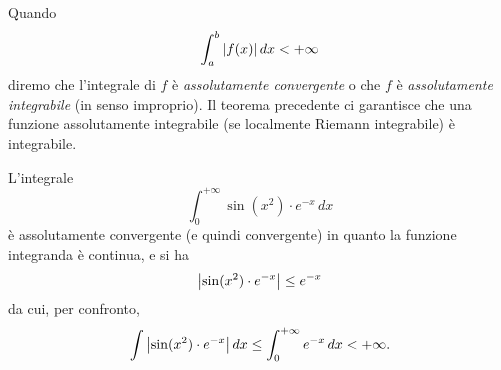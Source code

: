 \begin{definition}
%
%
%
%
%
Quando
\[
  \int_a^b {\left|f(x)\right|}\, dx <+\infty
\]
diremo che l'integrale di $f$ è \emph{assolutamente convergente}
o che $f$ è \emph{assolutamente integrabile} (in senso improprio).
Il teorema
precedente ci garantisce che una funzione assolutamente integrabile
(se localmente Riemann integrabile) è integrabile.
\end{definition}

\begin{example}
L'integrale
\[
  \int_0^{+\infty} \sin(x^2)\cdot e^{-x}\, dx
\]
è assolutamente convergente (e quindi convergente)
in quanto la funzione integranda è continua,
e si ha
\[
 {\left|\sin(x^2)\cdot e^{-x}\right|} \le e^{-x}
\]
da cui, per confronto,
\[
 \int {\left|\sin(x^2)\cdot e^{-x}\right|}\, dx  \le
  \int_0^{+\infty} e^{-x}\, dx < +\infty.
\]
\end{example}

